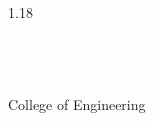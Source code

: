 \begin{spacing}{1.18}
	\vspace*{0.9cm}

	\begin{center}
		\textbf{\hod} \\
		\hoddes \\
		\deptabbr \\
		College of Engineering \\
		\collegetown
	\end{center}

\end{spacing}

\thispagestyle{empty}
